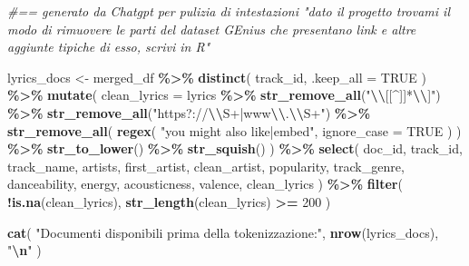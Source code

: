 \documentclass[
]{article}
\newenvironment{Shaded}{\begin{snugshade}}{\end{snugshade}}
\newcommand{\AttributeTok}[1]{\textcolor[rgb]{0.13,0.29,0.53}{#1}}
\newcommand{\CommentTok}[1]{\textcolor[rgb]{0.56,0.35,0.01}{\textit{#1}}}
\newcommand{\ConstantTok}[1]{\textcolor[rgb]{0.56,0.35,0.01}{#1}}
\newcommand{\DecValTok}[1]{\textcolor[rgb]{0.00,0.00,0.81}{#1}}
\newcommand{\FunctionTok}[1]{\textcolor[rgb]{0.13,0.29,0.53}{\textbf{#1}}}
\newcommand{\NormalTok}[1]{#1}
\newcommand{\OtherTok}[1]{\textcolor[rgb]{0.56,0.35,0.01}{#1}}
\newcommand{\SpecialCharTok}[1]{\textcolor[rgb]{0.81,0.36,0.00}{\textbf{#1}}}
\newcommand{\StringTok}[1]{\textcolor[rgb]{0.31,0.60,0.02}{#1}}
\begin{document}
\begin{Shaded}
\begin{Highlighting}[]
\CommentTok{\#== generato da Chatgpt per pulizia di intestazioni "dato il progetto trovami il modo di rimuovere le parti del dataset GEnius che presentano link e altre aggiunte tipiche di esso, scrivi in R"}

\NormalTok{lyrics\_docs }\OtherTok{\textless{}{-}}\NormalTok{ merged\_df }\SpecialCharTok{\%\textgreater{}\%}
  \FunctionTok{distinct}\NormalTok{(}
\NormalTok{    track\_id,}
    \AttributeTok{.keep\_all =} \ConstantTok{TRUE}
\NormalTok{  ) }\SpecialCharTok{\%\textgreater{}\%}
  \FunctionTok{mutate}\NormalTok{(}
    \AttributeTok{clean\_lyrics =}\NormalTok{ lyrics }\SpecialCharTok{\%\textgreater{}\%}
      \FunctionTok{str\_remove\_all}\NormalTok{(}\StringTok{"}\SpecialCharTok{\textbackslash{}\textbackslash{}}\StringTok{[[\^{}]]*}\SpecialCharTok{\textbackslash{}\textbackslash{}}\StringTok{]"}\NormalTok{) }\SpecialCharTok{\%\textgreater{}\%}
      \FunctionTok{str\_remove\_all}\NormalTok{(}\StringTok{"https?://}\SpecialCharTok{\textbackslash{}\textbackslash{}}\StringTok{S+|www}\SpecialCharTok{\textbackslash{}\textbackslash{}}\StringTok{.}\SpecialCharTok{\textbackslash{}\textbackslash{}}\StringTok{S+"}\NormalTok{) }\SpecialCharTok{\%\textgreater{}\%}
      \FunctionTok{str\_remove\_all}\NormalTok{(}
        \FunctionTok{regex}\NormalTok{(}
          \StringTok{"you might also like|embed"}\NormalTok{,}
          \AttributeTok{ignore\_case =} \ConstantTok{TRUE}
\NormalTok{        )}
\NormalTok{      ) }\SpecialCharTok{\%\textgreater{}\%}
      \FunctionTok{str\_to\_lower}\NormalTok{() }\SpecialCharTok{\%\textgreater{}\%}
      \FunctionTok{str\_squish}\NormalTok{()}
\NormalTok{  ) }\SpecialCharTok{\%\textgreater{}\%}
  \FunctionTok{select}\NormalTok{(}
\NormalTok{    doc\_id,}
\NormalTok{    track\_id,}
\NormalTok{    track\_name,}
\NormalTok{    artists,}
\NormalTok{    first\_artist,}
\NormalTok{    clean\_artist,}
\NormalTok{    popularity,}
\NormalTok{    track\_genre,}
\NormalTok{    danceability,}
\NormalTok{    energy,}
\NormalTok{    acousticness,}
\NormalTok{    valence,}
\NormalTok{    clean\_lyrics}
\NormalTok{  ) }\SpecialCharTok{\%\textgreater{}\%}
  \FunctionTok{filter}\NormalTok{(}
    \SpecialCharTok{!}\FunctionTok{is.na}\NormalTok{(clean\_lyrics),}
    \FunctionTok{str\_length}\NormalTok{(clean\_lyrics) }\SpecialCharTok{\textgreater{}=} \DecValTok{200}
\NormalTok{  )}

\FunctionTok{cat}\NormalTok{(}
  \StringTok{"Documenti disponibili prima della tokenizzazione:"}\NormalTok{,}
  \FunctionTok{nrow}\NormalTok{(lyrics\_docs),}
  \StringTok{"}\SpecialCharTok{\textbackslash{}n}\StringTok{"}
\NormalTok{)}
\end{Highlighting}
\end{Shaded}
\end{document}
